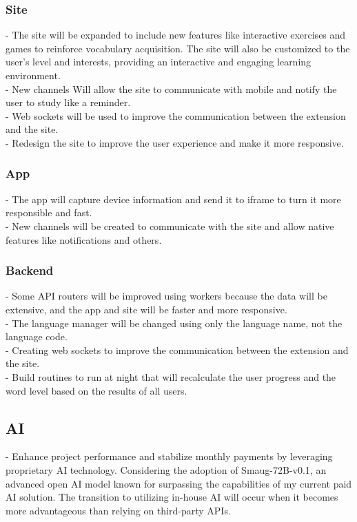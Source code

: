 \documentclass[12pt]{article}
\begin{document}
\subsubsection{Site}
- The site will be expanded to include new features like interactive exercises and games to reinforce vocabulary acquisition. The site will also be customized to the user's level and interests, providing an interactive and engaging learning environment.  \\
- New channels Will allow the site to communicate with mobile and notify the user to study like a reminder. \\
- Web sockets will be used to improve the communication between the extension and the site. \\
- Redesign the site to improve the user experience and make it more responsive.

\subsubsection{App}
- The app will capture device information and send it to iframe to turn it more responsible and fast.  \\
- New channels will be created to communicate with the site and allow native features like notifications and others.

\subsubsection{Backend} 
- Some API routers will be improved using workers because the data will be extensive, and the app and site will be faster and more responsive. \\
- The language manager will be changed using only the language name, not the language code.  \\
- Creating web sockets to improve the communication between the extension and the site. \\
- Build routines to run at night that will recalculate the user progress and the word level based on the results of all users.

\subsection{AI}
- Enhance project performance and stabilize monthly payments by leveraging proprietary AI technology. Considering the adoption of Smaug-72B-v0.1, an advanced open AI model known for surpassing the capabilities of my current paid AI solution. The transition to utilizing in-house AI will occur when it becomes more advantageous than relying on third-party APIs.
\end{document}
